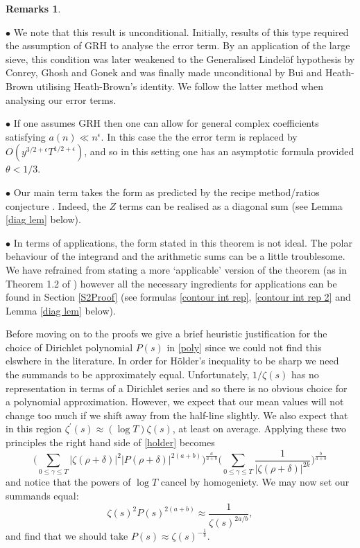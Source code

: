 \documentclass[oneside, 12pt]{amsart}
\theoremstyle{definition}
\newtheorem*{rems}{Remarks}
\newcommand{\leqs}{\leqslant }
\begin{document}
\begin{rems}
${}$

$\bullet$ We note that this result is unconditional. Initially, results of this type required the assumption of GRH \cite{CGG} to analyse the error term. By an application of the large sieve, this condition was later weakened to the Generalised Lindel\"of hypothesis by Conrey, Ghosh and Gonek \cite{CGGSimple} and was finally made unconditional by Bui and Heath-Brown \cite{HBB} utilising Heath-Brown's identity. We follow the latter method when analysing our error terms. 

$\bullet$ If one assumes GRH then one can allow for general complex coefficients satisfying $a(n)\ll n^\epsilon$. In this case the the error term is replaced by $O(y^{3/2+\epsilon}T^{1/2+\epsilon})$, and so in this setting one has an asymptotic formula  provided $\theta<1/3$.

$\bullet$ Our main term takes the form as predicted by the recipe method/ratios conjecture \cite{CFKRS,CS}. Indeed, the $Z$ terms can be realised as a diagonal sum (see Lemma \ref{diag lem} below).

$\bullet$ In terms of applications, the form stated in this theorem is not ideal. The polar behaviour of the integrand and the arithmetic sums can be a little troublesome. We have refrained from stating a more `applicable' version of the theorem (as in Theorem 1.2 of \cite{BBLR}) however all the necessary ingredients for applications can be found in Section \ref{S2Proof} (see formulas \eqref{contour int rep}, \eqref{contour int rep 2} and Lemma \ref{diag lem} below).  

\end{rems}

Before moving on to the proofs we give a brief heuristic justification for the choice of Dirichlet polynomial $P(s)$ in \eqref{poly} since we could not find this elswhere in the literature. In order for H\"older's inequality to be sharp we need the summands to be approximately equal. Unfortunately, $1/\zeta(s)$ has no representation in terms of a Dirichlet series and so there is no obvious choice for a polynomial approximation. However, we expect that our mean values will not change too much if we shift away from the half-line slightly. We also expect that in this region $\zeta^\prime(s)\approx (\log T) \zeta(s)$, at least on average. Applying these two principles the right hand side of \eqref{holder} becomes
 \[
 \Big(\sum_{0\leqs \gamma\leqs T}|\zeta(\rho+\delta)|^2|P(\rho+\delta)|^{2(a+b)}\Big)^{\frac{a}{a+b}}
  \Big(\sum_{0\leqs \gamma\leqs T}\frac{1}{|\zeta(\rho+\delta)|^{2k}}\Big)^{\frac{b}{a+b}}
\]
and notice that the powers of $\log T$ cancel by homogeniety. We may now set our summands equal:
\[
\zeta(s)^2P(s)^{2(a+b)}\approx \frac{1}{\zeta(s)^{2a/b}},
\]
and find that we should take $P(s)\approx \zeta(s)^{-\frac{1}{b}}$. 
\end{document}
